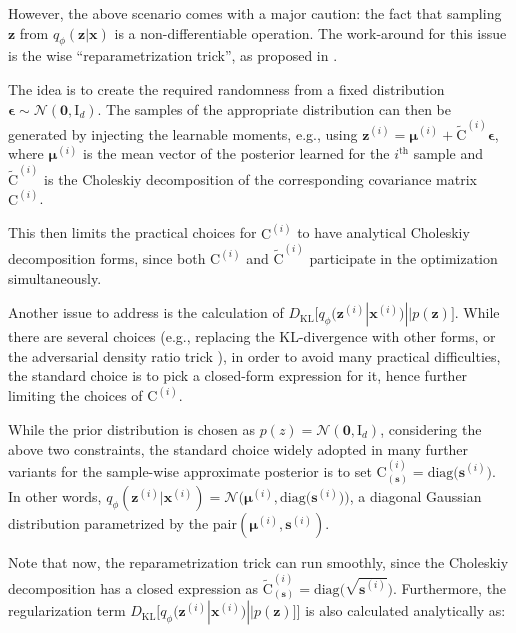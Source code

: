 \documentclass{article}
\begin{document}
However, the above scenario comes with a major caution: the fact that sampling $\mathbf{z}$ from $q_{\phi}(\mathbf{z} | \mathbf{x})$ is a non-differentiable operation. The work-around for this issue is the wise ``reparametrization trick'', as proposed in \cite{VAE}. 

The idea is to create the required randomness from a fixed distribution $\boldsymbol{\epsilon} \sim \mathcal{N}(\mathbf{0}, \mathrm{I}_d)$. The samples of the appropriate distribution can then be generated by injecting the learnable moments, e.g., using $\mathbf{z}^{(i)} = \boldsymbol{\mu}^{(i)} + \tilde{\mathrm{C}}^{(i)} \boldsymbol{\epsilon}$, where $\boldsymbol{\mu}^{(i)}$ is the mean vector of the posterior learned for the $i^{\text{th}}$ sample and $\tilde{\mathrm{C}}^{(i)}$ is the Choleskiy decomposition of the corresponding covariance matrix $\mathrm{C}^{(i)}$.

This then limits the practical choices for $\mathrm{C}^{(i)}$ to have analytical Choleskiy decomposition forms, since both $\mathrm{C}^{(i)}$ and $\tilde{\mathrm{C}}^{(i)}$ participate in the optimization simultaneously.

Another issue to address is the calculation of $D_{\text{KL}}\big[ q_{\phi}(\mathbf{z}^{(i)}  | \mathbf{x}^{(i)}) || p(\mathbf{z}) \big]$. While there are several choices (e.g., replacing the KL-divergence with other forms, or the adversarial density ratio trick \cite{nguyen2010estimating}), in order to avoid many practical difficulties, the standard choice is to pick a closed-form expression for it, hence further limiting the choices of $\mathrm{C}^{(i)}$.

While the prior distribution is chosen as $p(z) = \mathcal{N}(\mathbf{0}, \mathrm{I}_d)$, considering the above two constraints, the standard choice widely adopted in many further variants for the sample-wise approximate posterior is to set $\mathrm{C}_{(\mathbf{s})}^{(i)} = \text{diag} \big( \mathbf{s}^{(i)} \big)$. In other words,  $q_{\phi}(\mathbf{z}^{(i)}  | \mathbf{x}^{(i)}) = \mathcal{N} \Big( \boldsymbol{\mu}^{(i)}, \text{diag} \big( \mathbf{s}^{(i)} \big)  \Big)$, a diagonal Gaussian distribution parametrized by the pair$(\boldsymbol{\mu}^{(i)}, \mathbf{s}^{(i)})$.

Note that now, the reparametrization trick can run smoothly, since the Choleskiy decomposition has a closed expression as $\tilde{\mathrm{C}}_{(\mathbf{s})}^{(i)} = \text{diag} \big( \sqrt{\mathbf{s}^{(i)}} \big) $. Furthermore, the regularization term $D_{\text{KL}}\big[ q_{\phi}(\mathbf{z}^{(i)}  | \mathbf{x}^{(i)}) || p(\mathbf{z}) \big] \Big]$ is also calculated analytically as:
\end{document}
